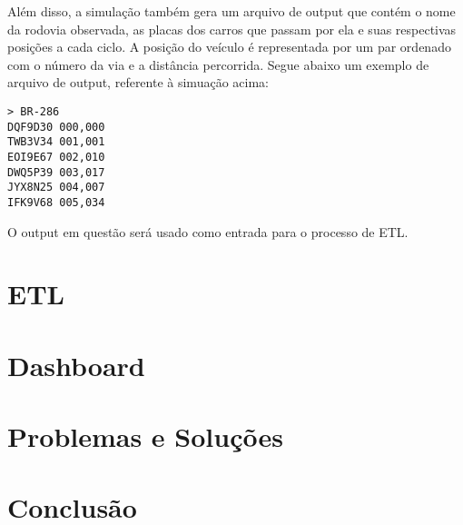 \documentclass{article}
\begin{document}
    Além disso, a simulação também gera um arquivo de output que contém o nome da rodovia observada,
    as placas dos carros que passam por ela e suas respectivas posições a cada ciclo. A posição do
    veículo é representada por um par ordenado com o número da via e a distância percorrida.
    Segue abaixo um exemplo de arquivo de output, referente à simuação acima:

    \begin{verbatim}
> BR-286
DQF9D30 000,000
TWB3V34 001,001
EOI9E67 002,010
DWQ5P39 003,017
JYX8N25 004,007
IFK9V68 005,034
    \end{verbatim}

    O output em questão será usado como entrada para o processo de ETL.

    \section{ETL}

    \section{Dashboard}

    \section{Problemas e Soluções}

    \section{Conclusão}
\end{document}
